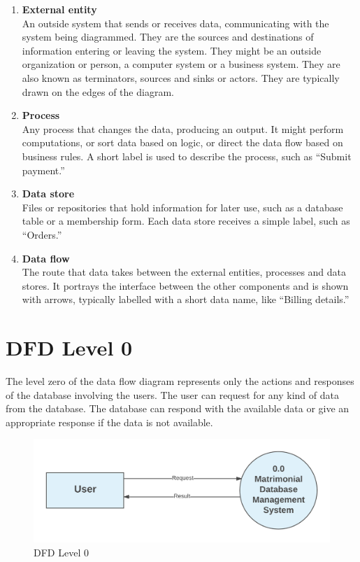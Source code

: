 \documentclass[12pt]{report}
\begin{document}
\begin{enumerate}
\item \textbf{External entity} \\An outside system that sends or receives data, communicating with the system being diagrammed. They are the sources and destinations of information entering or leaving the system. They might be an outside organization or person, a computer system or a business system. They are also known as terminators, sources and sinks or actors. They are typically drawn on the edges of the diagram.

\item \textbf{Process} \\ Any process that changes the data, producing an output. It might perform computations, or sort data based on logic, or direct the data flow based on business rules. A short label is used to describe the process, such as “Submit payment.”

\item \textbf{Data store} \\Files or repositories that hold information for later use, such as a database table or a membership form. Each data store receives a simple label, such as “Orders.”

\item \textbf{Data flow} \\The route that data takes between the external entities, processes and data stores. It portrays the interface between the other components and is shown with arrows, typically labelled with a short data name, like “Billing details.”

\end{enumerate}


\section{DFD Level 0}

The level zero of the data flow diagram represents only the actions and responses of the database involving the users. The user can request for any kind of data from the database. The database can respond with the available data or give an appropriate response if the data is not available. 


\begin{figure}[!htb]
    \centering
    \includegraphics[width=1\textwidth]{df-l0.png}
    \caption{DFD Level 0}
    \label{fig:dfd l0}
\end{figure}
\end{document}
